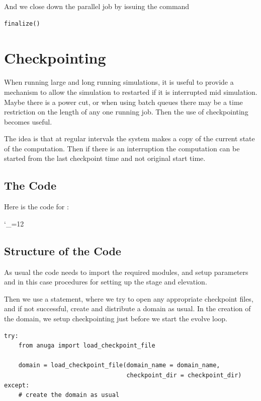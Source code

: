 \documentclass{manual}
\newcommand{\verbatiminputB}[1]{%
\endgroup}
\def\verbatiminputunderscore{\begingroup 
\catcode`\_=12
\verbatiminputB}
\begin{document}
And we close down the parallel job by issuing the command 

\begin{verbatim}
finalize()
\end{verbatim}


\chapter{Checkpointing}

When running large and long running simulations, it is useful to provide a mechanism to allow the simulation to restarted if it is interrupted mid simulation. Maybe there is a power cut, or when using batch queues there may be a time restriction on the length of any one running job. Then the use of checkpointing becomes useful. 

The idea is that at regular intervals the system makes a copy of the current state of the computation. Then if there is an interruption the computation can be started from the last checkpoint time and not original start time. 

\section{The Code}

Here is the code for :

\verbatiminputunderscore{../../anuga_core/examples/checkpointing/runCheckpoint.py}

\section{Structure of the Code}

As usual the code needs to import the required modules, and setup parameters and in this case procedures for setting up the stage and elevation. 

Then we use a  statement, where we try to open any appropriate checkpoint files, and if not successful, create and distribute a domain as usual. In the creation of the domain, we setup checkpointing just before we start the evolve loop. 


\begin{verbatim}
try:	
    from anuga import load_checkpoint_file
	
    domain = load_checkpoint_file(domain_name = domain_name, 
                                  checkpoint_dir = checkpoint_dir)
except:
    # create the domain as usual
\end{verbatim}
\end{document}
